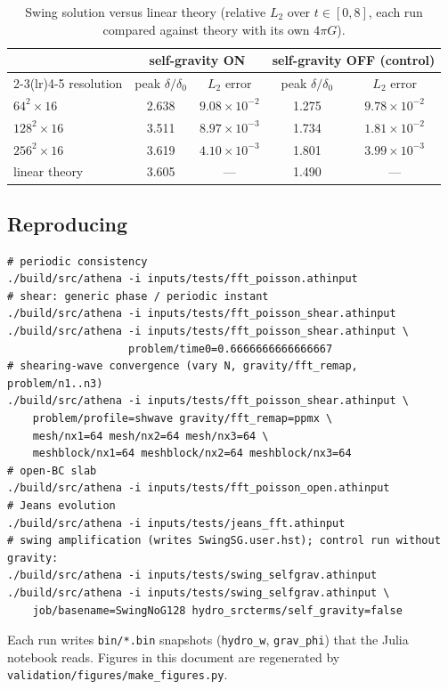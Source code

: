 \documentclass[11pt]{article}
\newcommand{\code}[1]{\texttt{#1}}
\begin{document}
\begin{table}[htb]
  \centering
  \caption{Swing solution versus linear theory (relative $L_2$ over $t\in[0,8]$,
  each run compared against theory with its own $4\pi G$).}
  \label{tab:swingconv}
  \begin{tabular}{@{}lcccc@{}}
  \toprule
   & \multicolumn{2}{c}{self-gravity ON} & \multicolumn{2}{c}{self-gravity OFF (control)} \\
  \cmidrule(lr){2-3}\cmidrule(lr){4-5}
  resolution & peak $\delta/\delta_0$ & $L_2$ error & peak $\delta/\delta_0$ & $L_2$ error \\
  \midrule
  $64^2\times16$  & 2.638 & $9.08\times10^{-2}$ & 1.275 & $9.78\times10^{-2}$ \\
  $128^2\times16$ & 3.511 & $8.97\times10^{-3}$ & 1.734 & $1.81\times10^{-2}$ \\
  $256^2\times16$ & 3.619 & $4.10\times10^{-3}$ & 1.801 & $3.99\times10^{-3}$ \\
  \midrule
  linear theory   & 3.605 & --- & 1.490 & --- \\
  \bottomrule
  \end{tabular}
\end{table}

\subsection{Reproducing}
\begin{lstlisting}
# periodic consistency
./build/src/athena -i inputs/tests/fft_poisson.athinput
# shear: generic phase / periodic instant
./build/src/athena -i inputs/tests/fft_poisson_shear.athinput
./build/src/athena -i inputs/tests/fft_poisson_shear.athinput \
                   problem/time0=0.6666666666666667
# shearing-wave convergence (vary N, gravity/fft_remap, problem/n1..n3)
./build/src/athena -i inputs/tests/fft_poisson_shear.athinput \
    problem/profile=shwave gravity/fft_remap=ppmx \
    mesh/nx1=64 mesh/nx2=64 mesh/nx3=64 \
    meshblock/nx1=64 meshblock/nx2=64 meshblock/nx3=64
# open-BC slab
./build/src/athena -i inputs/tests/fft_poisson_open.athinput
# Jeans evolution
./build/src/athena -i inputs/tests/jeans_fft.athinput
# swing amplification (writes SwingSG.user.hst); control run without gravity:
./build/src/athena -i inputs/tests/swing_selfgrav.athinput
./build/src/athena -i inputs/tests/swing_selfgrav.athinput \
    job/basename=SwingNoG128 hydro_srcterms/self_gravity=false
\end{lstlisting}
Each run writes \code{bin/*.bin} snapshots (\code{hydro\_w}, \code{grav\_phi})
that the Julia notebook reads. Figures in this document are regenerated by
\code{validation/figures/make\_figures.py}.
\end{document}

